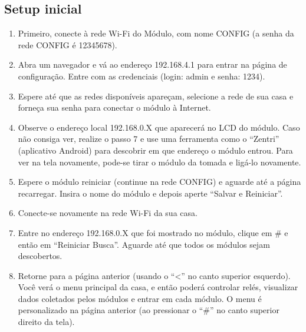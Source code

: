 \subsection{Setup inicial}
\begin{enumerate}
	\item Primeiro, conecte à rede Wi-Fi do Módulo, com nome CONFIG (a senha da rede CONFIG é 12345678).
	\item Abra um navegador e vá ao endereço 192.168.4.1 para entrar na página de configuração. Entre com as credenciais (login: admin e senha: 1234).
	\item Espere até que as redes disponíveis apareçam, selecione a rede de sua casa e forneça sua senha para conectar o módulo à Internet.
	\item Observe o endereço local 192.168.0.X que aparecerá no LCD do módulo. Caso não consiga ver, realize o passo 7 e use uma ferramenta como o “Zentri” (aplicativo Android) para descobrir em que endereço o módulo entrou. Para ver na tela novamente, pode-se tirar o módulo da tomada e ligá-lo novamente.
	\item Espere o módulo reiniciar (continue na rede CONFIG) e aguarde até a página recarregar. Insira o nome do módulo e depois aperte “Salvar e Reiniciar”.
	\item Conecte-se novamente na rede Wi-Fi da sua casa.
	\item Entre no endereço 192.168.0.X que foi mostrado no módulo, clique em \# e então em “Reiniciar Busca”. Aguarde até que todos os módulos sejam descobertos.
	\item Retorne para a página anterior (usando o “\textless” no canto superior esquerdo). Você verá o menu principal da casa, e então poderá controlar relés, visualizar dados coletados pelos módulos e entrar em cada módulo. O menu é personalizado na página anterior (ao pressionar o “\#” no canto superior direito da tela).
\end{enumerate}
